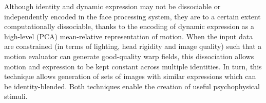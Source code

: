 \documentclass[runningheads]{llncs}
\begin{document}
Although identity and dynamic expression may not be dissociable or independently encoded in the face processing system, they are to a certain extent computationally dissociable, thanks to the encoding of dynamic expression as a high-level (PCA) mean-relative representation of motion. When the input data are constrained (in terms of lighting, head rigidity and image quality) such that a motion evaluator can generate good-quality warp fields, this dissociation allows motion and expression to be kept constant across multiple identities. In turn, this technique allows generation of sets of images with similar expressions which can be identity-blended. Both techniques enable the creation of useful psychophysical stimuli.









\end{document}

